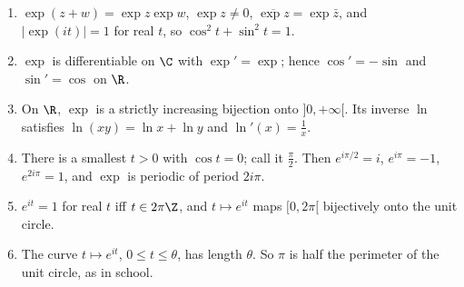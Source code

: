 \begin{theorem}\label{thm:exp}
\begin{enumerate}[label=(\alph*)]
\item $\exp(z+w)=\exp z\exp w$, $\exp z\ne0$, $\overline{\exp z}=\exp\bar z$, and $|\exp(it)|=1$ for real $t$, so $\cos^2t+\sin^2t=1$.
\item $\exp$ is differentiable on $\C$ with $\exp'=\exp$; hence $\cos'=-\sin$ and $\sin'=\cos$ on $\R$.
\item On $\R$, $\exp$ is a strictly increasing bijection onto $]0,+\infty[$. Its inverse $\ln$ satisfies $\ln(xy)=\ln x+\ln y$ and $\ln'(x)=\frac1x$.
\item There is a smallest $t>0$ with $\cos t=0$; call it $\frac\pi2$. Then $e^{i\pi/2}=i$, $e^{i\pi}=-1$, $e^{2i\pi}=1$, and $\exp$ is periodic of period $2i\pi$.
\item $e^{it}=1$ for real $t$ iff $t\in2\pi\Z$, and $t\mapsto e^{it}$ maps $[0,2\pi[$ bijectively onto the unit circle.
\item The curve $t\mapsto e^{it}$, $0\le t\le\theta$, has length $\theta$. So $\pi$ is half the perimeter of the unit circle, as in school.
\end{enumerate}
\end{theorem}
